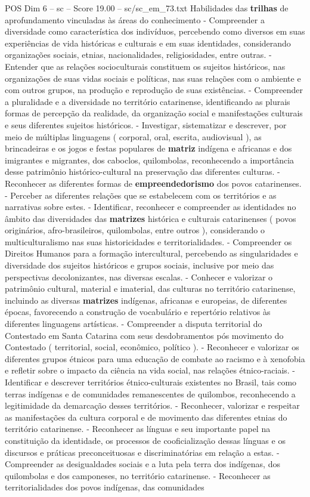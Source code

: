 \begin{textsample}{POS Dim 6 – sc – Score 19.00 – sc/sc\_em\_73.txt}
Habilidades das \textbf{trilhas} de aprofundamento vinculadas às áreas do conhecimento - Compreender a diversidade como característica dos indivíduos, percebendo como diversos em suas experiências de vida históricas e culturais e em suas identidades, considerando organizações sociais, etnias, nacionalidades, religiosidades, entre outras. - Entender que as relações socioculturais constituem os sujeitos históricos, nas organizações de suas vidas sociais e políticas, nas suas relações com o ambiente e com outros grupos, na produção e reprodução de suas existências. - Compreender a pluralidade e a diversidade no território catarinense, identificando as plurais formas de percepção da realidade, da organização social e manifestações culturais e seus diferentes sujeitos históricos. - Investigar, sistematizar e descrever, por meio de múltiplas linguagens ( corporal, oral, escrita, audiovisual ), as brincadeiras e os jogos e festas populares de \textbf{matriz} indígena e africanas e dos imigrantes e migrantes, dos caboclos, quilombolas, reconhecendo a importância desse patrimônio histórico-cultural na preservação das diferentes culturas. - Reconhecer as diferentes formas de \textbf{empreendedorismo} dos povos catarinenses. - Perceber as diferentes relações que se estabelecem com os territórios e as narrativas sobre estes. - Identificar, reconhecer e compreender as identidades no âmbito das diversidades das \textbf{matrizes} histórica e culturais catarinenses ( povos originários, afro-brasileiros, quilombolas, entre outros ), considerando o multiculturalismo nas suas historicidades e territorialidades. - Compreender os Direitos Humanos para a formação intercultural, percebendo as singularidades e diversidade dos sujeitos históricos e grupos sociais, inclusive por meio das perspectivas decolonizantes, nas diversas escalas. - Conhecer e valorizar o patrimônio cultural, material e imaterial, das culturas no território catarinense, incluindo as diversas \textbf{matrizes} indígenas, africanas e europeias, de diferentes épocas, favorecendo a construção de vocabulário e repertório relativos às diferentes linguagens artísticas. - Compreender a disputa territorial do Contestado em Santa Catarina com seus desdobramentos pós movimento do Contestado ( territorial, social, econômico, político ). - Reconhecer e valorizar os diferentes grupos étnicos para uma educação de combate ao racismo e à xenofobia e refletir sobre o impacto da ciência na vida social, nas relações étnico-raciais. - Identificar e descrever territórios étnico-culturais existentes no Brasil, tais como terras indígenas e de comunidades remanescentes de quilombos, reconhecendo a legitimidade da demarcação desses territórios. - Reconhecer, valorizar e respeitar as manifestações da cultura corporal e de movimento das diferentes etnias do território catarinense. - Reconhecer as línguas e seu importante papel na constituição da identidade, os processos de cooficialização dessas línguas e os discursos e práticas preconceituosas e discriminatórias em relação a estas. - Compreender as desigualdades sociais e a luta pela terra dos indígenas, dos quilombolas e dos camponeses, no território catarinense. - Reconhecer as territorialidades dos povos indígenas, das comunidades 
\end{textsample}
